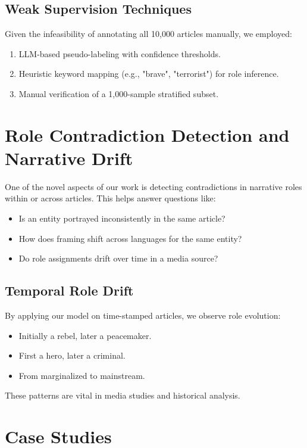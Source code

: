 \documentclass[12pt]{article}
\begin{document}
\subsection{Weak Supervision Techniques}

Given the infeasibility of annotating all 10,000 articles manually, we employed:
\begin{enumerate}
    \item LLM-based pseudo-labeling with confidence thresholds.
    \item Heuristic keyword mapping (e.g., "brave", "terrorist") for role inference.
    \item Manual verification of a 1,000-sample stratified subset.
\end{enumerate}

\section{Role Contradiction Detection and Narrative Drift}

One of the novel aspects of our work is detecting contradictions in narrative roles within or across articles. This helps answer questions like:
\begin{itemize}
    \item Is an entity portrayed inconsistently in the same article?
    \item How does framing shift across languages for the same entity?
    \item Do role assignments drift over time in a media source?
\end{itemize}

\subsection{Temporal Role Drift}

By applying our model on time-stamped articles, we observe role evolution:
\begin{itemize}
    \item Initially a rebel, later a peacemaker.
    \item First a hero, later a criminal.
    \item From marginalized to mainstream.
\end{itemize}

These patterns are vital in media studies and historical analysis.

\section{Case Studies}
\end{document}
